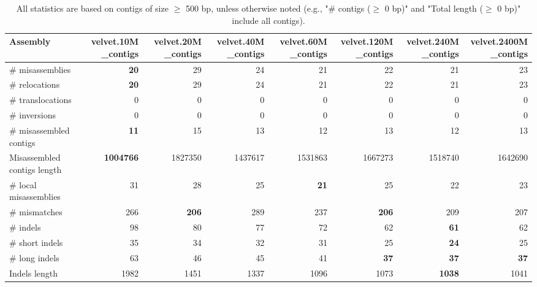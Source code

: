 \documentclass[12pt,a4paper]{article}
\begin{document}
\begin{table}[ht]
\begin{center}
\caption{All statistics are based on contigs of size $\geq$ 500 bp, unless otherwise noted (e.g., "\# contigs ($\geq$ 0 bp)" and "Total length ($\geq$ 0 bp)" include all contigs).}
\begin{tabular}{|l*{7}{|r}|}
\hline
Assembly & velvet.10M\_contigs & velvet.20M\_contigs & velvet.40M\_contigs & velvet.60M\_contigs & velvet.120M\_contigs & velvet.240M\_contigs & velvet.2400M\_contigs \\ \hline
\# misassemblies & {\bf 20} & 29 & 24 & 21 & 22 & 21 & 23 \\ \hline
\hspace{5mm}\# relocations & {\bf 20} & 29 & 24 & 21 & 22 & 21 & 23 \\ \hline
\hspace{5mm}\# translocations & 0 & 0 & 0 & 0 & 0 & 0 & 0 \\ \hline
\hspace{5mm}\# inversions & 0 & 0 & 0 & 0 & 0 & 0 & 0 \\ \hline
\# misassembled contigs & {\bf 11} & 15 & 13 & 12 & 13 & 12 & 13 \\ \hline
Misassembled contigs length & {\bf 1004766} & 1827350 & 1437617 & 1531863 & 1667273 & 1518740 & 1642690 \\ \hline
\# local misassemblies & 31 & 28 & 25 & {\bf 21} & 25 & 22 & 23 \\ \hline
\# mismatches & 266 & {\bf 206} & 289 & 237 & {\bf 206} & 209 & 207 \\ \hline
\# indels & 98 & 80 & 77 & 72 & 62 & {\bf 61} & 62 \\ \hline
\hspace{5mm}\# short indels & 35 & 34 & 32 & 31 & 25 & {\bf 24} & 25 \\ \hline
\hspace{5mm}\# long indels & 63 & 46 & 45 & 41 & {\bf 37} & {\bf 37} & {\bf 37} \\ \hline
Indels length & 1982 & 1451 & 1337 & 1096 & 1073 & {\bf 1038} & 1041 \\ \hline
\end{tabular}
\end{center}
\end{table}
\end{document}
